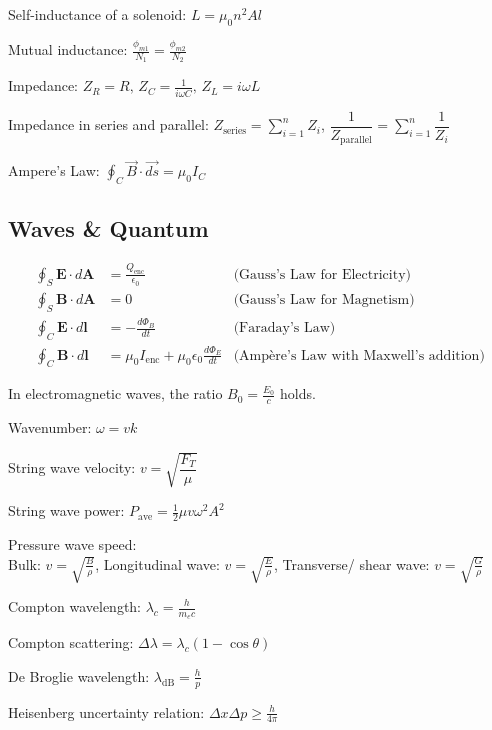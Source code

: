 \documentclass[12pt,a4paper]{article}
\begin{document}
	Self-inductance of a solenoid: \( L = \mu_0 n^2 A l \)
	
	Mutual inductance: \( \frac{\phi_{m1}}{N_1} = \frac{\phi_{m2}}{N_2} \)
	
	Impedance: \( Z_R = R, \, Z_C = \frac{1}{i \omega C}, \, Z_L = i \omega L \)
	
	Impedance in series and parallel:
	\( Z_\text{series} = \sum_{i=1}^{n}Z_i\), \(\dfrac{1}{Z_\text{parallel}} = \sum_{i=1}^{n}\dfrac{1}{Z_i}\)
	
	Ampere's Law: \( \oint_C \vec{B} \cdot \vec{ds} = \mu_0 I_C\)
	
	
	\subsection*{Waves \& Quantum}
	\begin{align}
		\oint_{S} \mathbf{E} \cdot d\mathbf{A} &= \frac{Q_{\text{enc}}}{\epsilon_0} &\text{(Gauss's Law for Electricity)} \\
		\oint_{S} \mathbf{B} \cdot d\mathbf{A} &= 0 &\text{(Gauss's Law for Magnetism)} \\
		\oint_{C} \mathbf{E} \cdot d\mathbf{l} &= -\frac{d\Phi_{B}}{dt} &\text{(Faraday's Law)} \\
		\oint_{C} \mathbf{B} \cdot d\mathbf{l} &= \mu_0 I_{\text{enc}} + \mu_0 \epsilon_0 \frac{d\Phi_{E}}{dt} &\text{(Ampère's Law with Maxwell's addition)}
	\end{align}
	
	In electromagnetic waves, the ratio \( B_0 = \frac{E_0}{c} \) holds.
	
	Wavenumber: \( \omega = vk \)
	
	String wave velocity: \( v = \sqrt{\dfrac{F_T}{\mu}}\)
	
	String wave power: \( P_\text{ave} = \frac{1}{2} \mu v \omega ^2 A^2\)
	
	Pressure wave speed:\\
	
	Bulk: \( v = \sqrt{\frac{B}{\rho}}\), Longitudinal wave: \( v = \sqrt{\frac{E}{\rho}}\),  Transverse/ shear wave: \( v = \sqrt{\frac{G}{\rho}}\)
	
	Compton wavelength: \( \lambda_c = \frac{h}{m_e c} \)
	
	Compton scattering: \( \Delta \lambda = \lambda_c (1-\cos \theta )\)
	
	De Broglie wavelength: \( \lambda_{\text{dB}} = \frac{h}{p} \)
	
	Heisenberg uncertainty relation: \( \Delta x \Delta p \geq \frac{h}{4\pi} \)
	
\end{document}
